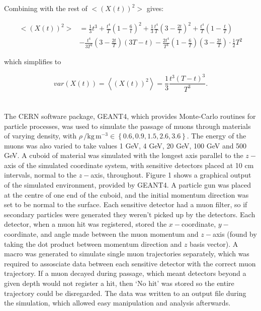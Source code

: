 \documentclass{article}
\numberwithin{equation}{section}
\begin{document}
\newpage
Combining with the rest of $\big<(X(t))^2\big>$ gives:

\begin{equation}
  \begin{aligned}
    \big<(X(t))^2\big> &= \frac{1}{3}t^3+\frac{t^4}{T}\left(1-\frac{6}{t}\right)^2+\frac{1}{3}\frac{t^4}{T}\left(3-\frac{2t}{T}\right)^2+\frac{t^4}{T}\left(1-\frac{t}{T}\right)\\
    &-\frac{t^4}{3T^2}\left(3-\frac{2t}{T}\right)\left(3T-t\right)-\frac{2t^4}{T^3}\left(1-\frac{6}{T}\right)\left(3-\frac{2t}{T}\right)\cdot\frac{1}{2}T^2
  \end{aligned}
\end{equation}

which simplifies to

\begin{equation}
    var(X(t)) = \left<(X(t))^2\right> = \boxed{\frac{1}{3}\frac{t^3\left(T-t\right)^3}{T^3}.}
\end{equation}

\clearpage
\section{}
\subsection{}
The CERN software package, GEANT4, which provides Monte-Carlo routines for particle processes, was used to simulate the passage of muons through materials of varying density, with $\rho\,/\text{kg}\,\text{m}^{-3} \in \left\{ 0.6, 0.9, 1.5, 2.6, 3.6 \right\}$. The energy of the muons was also varied to take values 1 GeV, 4 GeV, 20 GeV, 100 GeV and 500 GeV. A cuboid of material was simulated with the longest axis parallel to the $z-$axis of the simulated coordinate system, with sensitive detectors placed at 10 cm intervals, normal to the $z-$axis, throughout. Figure 1 shows a graphical output of the simulated environment, provided by GEANT4. A particle gun was placed at the centre of one end of the cuboid, and the initial momentum direction was set to be normal to the surface. Each sensitive detector had a muon filter, so if secondary particles were generated they weren't picked up by the detectors. Each detector, when a muon hit was registered, stored the $x-$coordinate, $y-$coordinate, and angle made between the muon momentum and $z-$axis (found by taking the dot product between momentum direction and $z$ basis vector). A macro was generated to simulate single muon trajectories separately, which was required to assosciate data between each sensitive detector with the correct muon trajectory. If a muon decayed during passage, which meant detectors beyond a given depth would not register a hit, then `No hit' was stored so the entire trajectory could be disregarded. The data was written to an output file during the simulation, which allowed easy manipulation and analysis afterwards.
\end{document}
